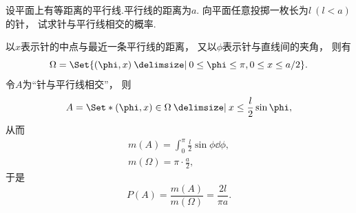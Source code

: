 \begin{example}[布冯投针问题]
设平面上有等距离的平行线.平行线的距离为\(a\).
向平面任意投掷一枚长为\(l\ (l<a)\)的针，
试求针与平行线相交的概率.
\begin{solution}
以\(x\)表示针的中点与最近一条平行线的距离，
又以\(\phi\)表示针与直线间的夹角，
则有\begin{equation*}
	\Omega = \Set{ (\phi,x) \given 0 \leq \phi \leq \pi, 0 \leq x \leq a/2 }.
\end{equation*}
令\(A\)为“针与平行线相交”，
则\begin{equation*}
	A = \Set*{ (\phi,x)\in\Omega \given x \leq \frac{l}{2} \sin\phi },
\end{equation*}
从而\begin{gather*}
	m(A) = \int_0^\pi\frac{l}{2} \sin\phi \dd{\phi}, \\
	m(\Omega) = \pi \cdot \frac{a}{2},
\end{gather*}
于是\begin{equation*}
	P(A)
	= \frac{m(A)}{m(\Omega)}
	= \frac{2l}{\pi a}.
\end{equation*}
\end{solution}
\end{example}
